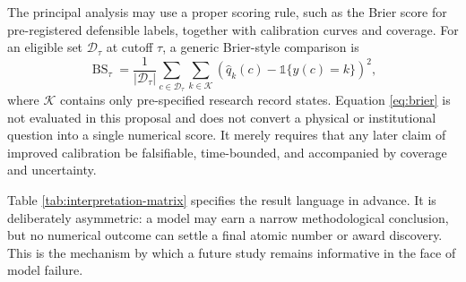 \documentclass[conference]{IEEEtran}
\begin{document}
The principal analysis may use a proper scoring rule, such as the Brier score for pre-registered defensible labels, together with calibration curves and coverage. For an eligible set $\mathcal{D}_{\tau}$ at cutoff $\tau$, a generic Brier-style comparison is
\begin{equation}
\operatorname{BS}_{\tau}=\frac{1}{|\mathcal{D}_{\tau}|}\sum_{c\in\mathcal{D}_{\tau}}\sum_{k\in\mathcal{K}}\left(\widehat{q}_{k}(c)-\mathbb{1}\{y(c)=k\}\right)^2,
\label{eq:brier}
\end{equation}
where $\mathcal{K}$ contains only pre-specified research record states. Equation \eqref{eq:brier} is not evaluated in this proposal and does not convert a physical or institutional question into a single numerical score. It merely requires that any later claim of improved calibration be falsifiable, time-bounded, and accompanied by coverage and uncertainty.

Table \ref{tab:interpretation-matrix} specifies the result language in advance. It is deliberately asymmetric: a model may earn a narrow methodological conclusion, but no numerical outcome can settle a final atomic number or award discovery. This is the mechanism by which a future study remains informative in the face of model failure.
\end{document}
